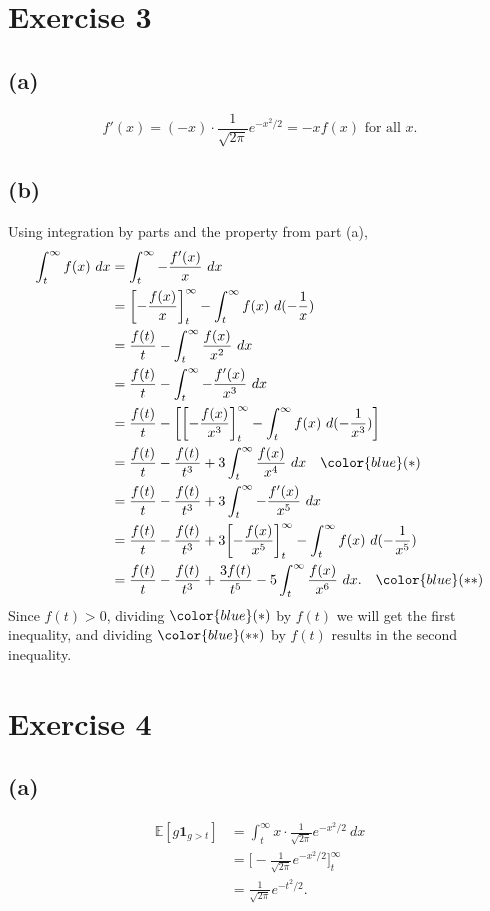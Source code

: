\newpage
\section*{Exercise 3}
\subsection*{(a)}
\[ f'(x) = (-x) \cdot \frac{1}{\sqrt{2 \pi}} e^{-x^2 / 2} = -xf(x) \text{ for all } x. \]

\subsection*{(b)}
Using integration by parts and the property from part (a), 
\begin{align*}
	\int_{t}^{\infty} f(x) \ dx
	&= \int_{t}^{\infty} -\frac{f'(x)}{x} \ dx \\
	&= \biggl[ -\frac{f(x)}{x} \biggr]_t^{\infty} - \int_{t}^{\infty} f(x) \ d(-\frac{1}{x}) \\
	&= \frac{f(t)}{t} - \int_{t}^{\infty} \frac{f(x)}{x^2} \ dx \\
	&= \frac{f(t)}{t} - \int_{t}^{\infty} -\frac{f'(x)}{x^3} \ dx \\
	&= \frac{f(t)}{t} - \biggl[ \biggl[ -\frac{f(x)}{x^3} \biggr]_t^\infty 
	- \int_{t}^{\infty} f(x) \ d(-\frac{1}{x^3}) \biggr] \\
	&= \frac{f(t)}{t} - \frac{f(t)}{t^3} + 3 \int_{t}^{\infty} \frac{f(x)}{x^4} \ dx \quad 
	{\color{blue} (*)} \\
	&= \frac{f(t)}{t} - \frac{f(t)}{t^3} + 3 \int_{t}^{\infty} -\frac{f'(x)}{x^5} \ dx \\
	&= \frac{f(t)}{t} - \frac{f(t)}{t^3} + 3 \biggl[ -\frac{f(x)}{x^5} \biggr]_t^\infty 
	- \int_{t}^{\infty} f(x) \ d(-\frac{1}{x^5}) \\
	&= \frac{f(t)}{t} - \frac{f(t)}{t^3} + \frac{3f(t)}{t^5} - 5 \int_{t}^{\infty} \frac{f(x)}{x^6} \ dx 
	. \quad {\color{blue} (**)}
\end{align*}
Since $f(t) > 0$, dividing $\color{blue} (*)$ by $f(t)$ we will get the first inequality, and dividing 
$\color{blue} (**)$ by $f(t)$ results in the second inequality.


\newpage
\section*{Exercise 4}
\subsection*{(a)}
\begin{align*}
	\mathbb{E}[g \mathbf{1}_{g > t}] 
	&= \int_{t}^{\infty} x \cdot \frac{1}{\sqrt{2 \pi}} e^{-x^2 / 2} \ dx \\
	&= \biggl[ -\frac{1}{\sqrt{2 \pi}} e^{-x^2 / 2} \biggr]_t^\infty \\
	&= \frac{1}{\sqrt{2 \pi}} e^{-t^2 / 2}.
\end{align*}

